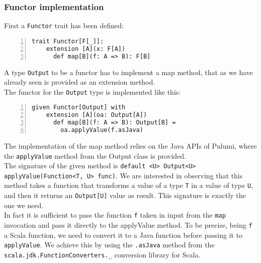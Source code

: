 \subsubsection{Functor implementation}
First a \texttt{Functor} trait has been defined:\\
\begin{minipage}{\linewidth}
\begin{lstlisting}[numbers=left, numberstyle=\tiny, numbersep=-5pt, stepnumber=1, linewidth=420pt]
  trait Functor[F[_]]:
    extension [A](x: F[A])
      def map[B](f: A => B): F[B]
\end{lstlisting}
\end{minipage}
A type \texttt{Output} to be a functor has to implement a map method, that as we have already seen is provided as an extension method.\\
The functor for the \texttt{Output} type is implemented like this:\\
\begin{minipage}{\linewidth}
\begin{lstlisting}[numbers=left, numberstyle=\tiny, numbersep=-5pt, stepnumber=1, linewidth=420pt]
  given Functor[Output] with
    extension [A](oa: Output[A])
      def map[B](f: A => B): Output[B] =
        oa.applyValue(f.asJava)
\end{lstlisting}
\end{minipage}
The implementation of the map method relies on the Java APIs of Pulumi, where the \texttt{applyValue} method from the Output class is provided.\\
The signature of the given method is \texttt{default <U> Output<U> applyValue(Function<T, U> func)}.
We are interested in observing that this method takes a function that transforms a value of a type \texttt{T} in a value of type \texttt{U}, and then it returns an \texttt{Output[U]} value as result.
This signature is exactly the one we need.\\
In fact it is sufficient to pass the function \texttt{f} taken in input from the \texttt{map} invocation and pass it directly to the applyValue method.
To be precise, being \texttt{f} a Scala function, we need to convert it to a Java function before passing it to \texttt{applyValue}.
We achieve this by using the \texttt{.asJava} method from the \texttt{scala.jdk.FunctionConverters.\_} conversion library for Scala.

